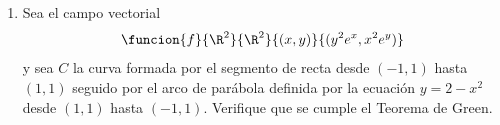 \documentclass[a4,11pt]{aleph-examen}
\begin{document}
\begin{preguntas}
\begin{respuesta}
\begin{respuesta}
\begin{respuesta}
\begin{enumerate}
\begin{respuesta}
    La integral de superficie de un campo vectorial está dada por:
	\[
        \iint_\alpha f dS=\iint_D f\l(\alpha (u,v) \r) \cdot N(u,v)dudv
    \]
    La parametrización sugerida es:
	\[
        \begin{aligned}
            x &= u \\
            y &= v\\
            z &= 1-u-2v \\
            \alpha (u,v)&=(u,v,1-u-2v)
        \end{aligned}
    \]
    Sabiendo que:
	\[
        \begin{aligned}
            T_u(u,v)&=\dfrac{\partial \alpha}{\partial u}(u,v)\\
            T_v(u,v)&=\dfrac{\partial \alpha}{\partial v}(u,v)
        \end{aligned}
    \]
    y que,
    \[
        N(u,v) = T_u(u,v) \times T_v(u,v)
    \]
    tenemos,
    \[
        \begin{aligned}
            N(u,v) &= (1,0,-1)\times(0,1,-2) \\
            N(u,v) &= (1,2,1)
        \end{aligned}
    \]
    La integral de superficie será,
	\[
        \begin{aligned}
            \iint_\alpha f dS&=\int_0^2 \int_0^2 \l(2e^{uv},-e^{uv},4uv\l(1-u-2v\r)\r) \cdot (1,2,1) dudv\\
                &=-48
        \end{aligned}
    \]
\end{respuesta}

\item 
    	Sea el campo vectorial
		\[
		\funcion{f}{\R^2}{\R^2}{(x,y)}{(y^2e^{x},x^2e^{y})}
		\]
		y sea $C$ la curva formada por el segmento de recta desde $(-1,1)$ hasta $(1,1)$ seguido por el arco de parábola definida por la ecuación $y=2-x^2$ desde $(1,1)$ hasta $(-1,1)$. Verifique que se cumple el Teorema de Green.


\end{enumerate}
\end{respuesta}
\end{respuesta}
\end{respuesta}
\end{preguntas}
\end{document}
